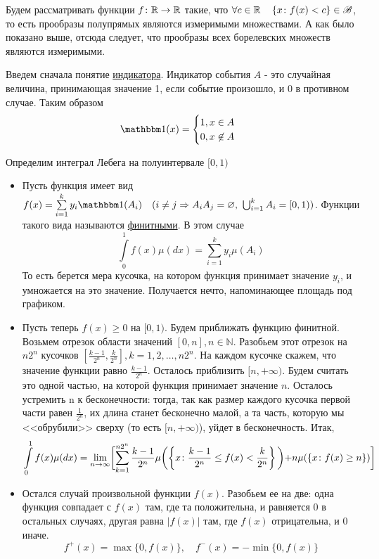  Будем рассматривать функции $f \colon \mathbb{R} \to \mathbb{R}$ такие, что $\forall c \in \mathbb{R} \quad \left\{ x \colon f(x) < c \right\} \in \mathscr{B}$, то есть прообразы полупрямых являются
  измеримыми множествами. А как было показано выше, отсюда следует, что прообразы всех борелевских множеств являются измеримыми.
  
  Введем сначала понятие \underline{индикатора}. Индикатор события $A$ - это случайная величина, принимающая значение 1, если событие произошло, и 0 в противном случае.
  Таким образом
  \[
  	\Ind(x) = 
  	\begin{cases}
  		1, x \in A \\
  		0, x \not\in A
  	\end{cases}
  \]
  
 Определим интеграл Лебега на полуинтервале $[0, 1)$
\begin{itemize}
 	\item Пусть функция имеет вид $f(x) = \sum\limits_{i=1}^ky_i \Ind(A_i) \quad (i \not= j \Rightarrow A_iA_j = \varnothing, \ \bigcup_{i=1}^k A_i= [0,1))$. Функции такого вида 		называются \underline{финитными}.  В этом случае
 		$$\int\limits_0^1f(x)\mu(dx) = \sum\limits_{i=1}^k y_i \mu(A_i) $$
	То есть берется мера кусочка, на котором функция принимает значение $y_i$, и умножается на это значение. Получается нечто, напоминающее площадь под графиком.
	\item Пусть теперь $f(x) \ge 0$ на $[0, 1)$. Будем приближать функцию финитной. Возьмем отрезок области значений $[0, n], n \in \mathbb{N}$. Разобьем этот отрезок на
	$n2^n$ кусочков $[\frac{k-1}{2^n}, \frac{k}{2^n}], k = 1, 2, \dots, n2^n$. На каждом кусочке скажем, что значение функции равно $\frac{k-1}{2^n}$. Осталось приблизить 
	$[n, +\infty)$. Будем считать это одной частью, на которой функция принимает значение $n$. Осталось устремить n к бесконечности: тогда, так как размер каждого кусочка первой части равен $\frac{1}{2^n}$, их длина станет бесконечно малой, а та часть, которую мы <<обрубили>> сверху (то есть $[n, +\infty)$), уйдет в бесконечность. Итак,
	$$ \int\limits_0^1 f(x) \mu(dx) = \lim_{n \to \infty}  \biggl[  \sum\limits_{k=1}^{n2^n} \frac{k-1}{2^n} \mu\biggl(\left\{ x \colon \frac{k-1}{2^n} \le f(x) < \frac{k}{2^n} \right\}\biggl) 
	+ n \mu(\left\{ x \colon f(x) \ge n \right\})\biggl]$$
	\item Остался случай произвольной функции $f(x)$. Разобьем ее на две: одна функция совпадает с $f(x)$ там, где та положительна, и равняется 0 в остальных случаях,
	другая равна $|f(x)|$ там, где $f(x)$ отрицательна, и 0 иначе. 
	$$ f^+(x) = \max\{0, f(x)\},\quad f^-(x) = -\min\{0, f(x)\}$$

\end{itemize}
